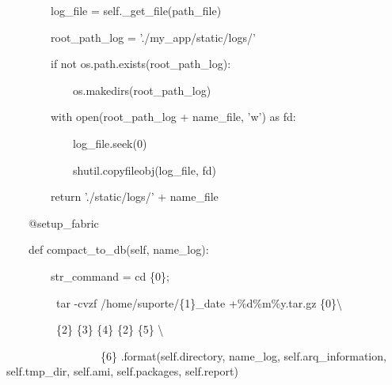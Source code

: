     \bigskip

{\ttfamily\color[rgb]{0.10980392,0.10980392,0.10980392}
    \ \ \ \ \ \ \ \ log\_file = self.\_get\_file(path\_file)}

{\ttfamily\color[rgb]{0.10980392,0.10980392,0.10980392}
    \ \ \ \ \ \ \ \ root\_path\_log = './my\_app/static/logs/'}


    \bigskip

{\ttfamily\color[rgb]{0.10980392,0.10980392,0.10980392}
    \ \ \ \ \ \ \ \ if not os.path.exists(root\_path\_log):}

{\ttfamily\color[rgb]{0.10980392,0.10980392,0.10980392}
    \ \ \ \ \ \ \ \ \ \ \ \ os.makedirs(root\_path\_log)}


    \bigskip

{\ttfamily\color[rgb]{0.10980392,0.10980392,0.10980392}
    \ \ \ \ \ \ \ \ with open(root\_path\_log + name\_file, 'w') as fd:}

{\ttfamily\color[rgb]{0.10980392,0.10980392,0.10980392}
    \ \ \ \ \ \ \ \ \ \ \ \ log\_file.seek(0)}

{\ttfamily\color[rgb]{0.10980392,0.10980392,0.10980392}
    \ \ \ \ \ \ \ \ \ \ \ \ shutil.copyfileobj(log\_file, fd)}

{\ttfamily\color[rgb]{0.10980392,0.10980392,0.10980392}
    \ \ \ \ \ \ \ \ return './static/logs/' + name\_file}


    \bigskip

{\ttfamily\color[rgb]{0.10980392,0.10980392,0.10980392}
    \ \ \ \ @setup\_fabric}

{\ttfamily\color[rgb]{0.10980392,0.10980392,0.10980392}
    \ \ \ \ def compact\_to\_db(self, name\_log):}

{\ttfamily\color[rgb]{0.10980392,0.10980392,0.10980392}
    \ \ \ \ \ \ \ \ str\_command = {\textquotedbl}{\textquotedbl}{\textquotedbl}cd \{0\};}

{\ttfamily\color[rgb]{0.10980392,0.10980392,0.10980392}
    \ \ \ \ \ \ \ \ \ tar -cvzf /home/suporte/\{1\}\_{\textasciigrave}date +\%d\%m\%y{\textasciigrave}.tar.gz
        \{0\}{\textbackslash}}

{\ttfamily\color[rgb]{0.10980392,0.10980392,0.10980392}
    \ \ \ \ \ \ \ \ \ \{2\} \{3\} \{4\} \{2\} \{5\} {\textbackslash}}

{\ttfamily\color[rgb]{0.10980392,0.10980392,0.10980392}
    \ \ \ \ \ \ \ \ \ \ \ \ \ \ \ \ \ \{6\} {\textquotedbl}{\textquotedbl}{\textquotedbl}.format(self.directory, name\_log,
            self.arq\_information, self.tmp\_dir, self.ami, self.packages, self.report)}

